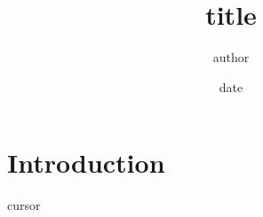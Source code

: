 \documentclass[11pt]{report}
\title{ {{title}} }
\author{ {{author}} }
\date{ {{date}} }
\begin{document}
\maketitle
\tableofcontents

\chapter{Introduction}
{{cursor}}
\end{document}
